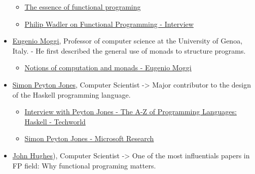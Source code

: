 \documentclass[11pt]{article}
\begin{document}
\begin{itemize}
\begin{itemize}
\item \href{http://www.eliza.ch/doc/wadler92essence_of_FP.pdf}{The essence of functional programing}
\item \href{http://www.infoq.com/interviews/wadler-functional-programming}{Philip Wadler on Functional Programming - Interview}
\end{itemize}

\item \href{https://en.wikipedia.org/wiki/Eugenio_Moggi}{Eugenio Moggi}, Professor of computer science at the University of
Genoa, Italy. - He first described the general use of monads to
structure programs.

\begin{itemize}
\item \href{http://www.disi.unige.it/person/MoggiE/ftp/ic91.pdf}{Notions of computation and monads - Eugenio Moggi}
\end{itemize}

\item \href{https://en.wikipedia.org/wiki/Simon_Peyton_Jones}{Simon Peyton Jones}, Computer Scientist -> Major contributor to the
design of the Haskell programming language.

\begin{itemize}
\item \href{http://www.techworld.com.au/article/261007/a-z_programming_languages_haskell/?}{Interview with Peyton Jones - The A-Z of Programming Languages: Haskell - Techworld}

\item \href{http://research.microsoft.com/en-us/people/simonpj/}{Simon Peyton Jones - Microsoft Research}
\end{itemize}

\item \href{https://en.wikipedia.org/wiki/John_Hughes_(computer_scientist}{John Hughes}), Computer Scientist -> One of the most influentials
papers in FP field: Why functional programing matters.
\end{itemize}
\end{document}
